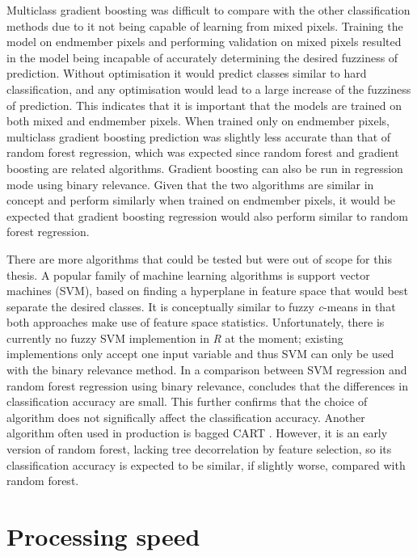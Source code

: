 \documentclass[a4paper,12pt]{scrbook}
\begin{document}
Multiclass gradient boosting was difficult to compare with the other classification methods due to it not being capable of learning from mixed pixels. Training the model on endmember pixels and performing validation on mixed pixels resulted in the model being incapable of accurately determining the desired fuzziness of prediction. Without optimisation it would predict classes similar to hard classification, and any optimisation would lead to a large increase of the fuzziness of prediction. This indicates that it is important that the models are trained on both mixed and endmember pixels. When trained only on endmember pixels, multiclass gradient boosting prediction was slightly less accurate than that of random forest regression, which was expected since random forest and gradient boosting are related algorithms. Gradient boosting can also be run in regression mode using binary relevance. Given that the two algorithms are similar in concept and perform similarly when trained on endmember pixels, it would be expected that gradient boosting regression would also perform similar to random forest regression.

There are more algorithms that could be tested but were out of scope for this thesis. A popular family of machine learning algorithms is support vector machines (SVM), based on finding a hyperplane in feature space that would best separate the desired classes. It is conceptually similar to fuzzy \textit{c}-means in that both approaches make use of feature space statistics. Unfortunately, there is currently no fuzzy SVM implemention in \textit{R} at the moment; existing implementions only accept one input variable and thus SVM can only be used with the binary relevance method. In a comparison between SVM regression and random forest regression using binary relevance, \citet{walton2008subpixelrf} concludes that the differences in classification accuracy are small. This further confirms that the choice of algorithm does not significally affect the classification accuracy. Another algorithm often used in production is bagged CART \citep{Hansen2016treeheight}. However, it is an early version of random forest, lacking tree decorrelation by feature selection, so its classification accuracy is expected to be similar, if slightly worse, compared with random forest.

\section{Processing speed}
\end{document}
